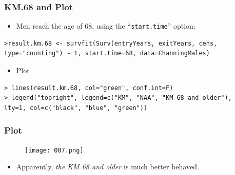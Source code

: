 \documentclass{beamer}
\newcommand{\empr}[1]{{\emph{\color{red}#1}}}
\begin{document}
\pagebreak
\begin{frame}[fragile]
\frametitle{KM.68 and Plot}
\begin{itemize}
\item Men reach the age of 68, using the ``\texttt{start.time}'' option: 
\end{itemize}
\begin{Verbatim}
>result.km.68 <- survfit(Surv(entryYears, exitYears, cens,
type="counting") ~ 1, start.time=68, data=ChanningMales)
\end{Verbatim}
\begin{itemize}
\item Plot
\end{itemize}
\begin{Verbatim}
> lines(result.km.68, col="green", conf.int=F)
> legend("topright", legend=c("KM", "NAA", "KM 68 and older"),
lty=1, col=c("black", "blue", "green"))
\end{Verbatim}
\end{frame}


\pagebreak
\begin{frame}
\frametitle{Plot}
\begin{figure}[h!]
	\texttt{[image: 007.png]}
\end{figure}
\begin{itemize}
\item Apparently, \empr{the KM 68 and older} is much {\color{red}better behaved}.
\end{itemize}
\end{frame}
\end{document}
